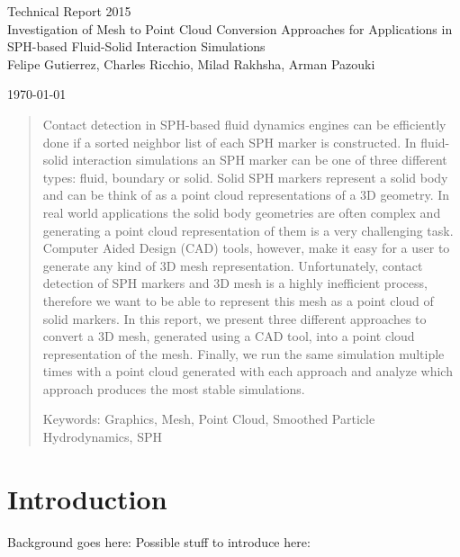 \documentclass[12pt]{article}
\begin{document}
\begin{titlepage}

\begin{center}
\LARGE Technical Report 2015 \\
\vspace{1.0in} 
\Large Investigation of Mesh to Point Cloud Conversion Approaches for Applications in SPH-based Fluid-Solid Interaction Simulations\\
\vspace{2.0in}
\mdseries Felipe Gutierrez, Charles Ricchio, Milad Rakhsha, Arman Pazouki \\

\vfill

\today

\end{center}

\end{titlepage}
\newpage 

\begin{abstract}
Contact detection in SPH-based fluid dynamics engines can be efficiently done if a sorted neighbor list of each SPH marker is constructed. In fluid-solid interaction simulations an SPH marker can be one of three different types: fluid, boundary or solid. Solid SPH markers represent a solid body and can be think of as a point cloud representations of a 3D geometry. In real world applications the solid body geometries are often complex and generating a point cloud representation of them is a very challenging task. Computer Aided Design (CAD) tools, however, make it easy for a user to generate any kind of 3D mesh representation. Unfortunately, contact detection of SPH markers and 3D mesh is a highly inefficient process, therefore we want to be able to represent this mesh as a point cloud of solid markers. In this report, we present three different approaches to convert a 3D mesh, generated using a CAD tool, into a point cloud representation of the mesh. Finally, we run the same simulation multiple times with a point cloud generated with each approach and analyze which approach produces the most stable simulations.

Keywords: Graphics, Mesh, Point Cloud, Smoothed Particle Hydrodynamics, SPH
\end{abstract}
\newpage 

\tableofcontents
\newpage

\section{Introduction}
\label{sec:introduction}
Background goes here:
Possible stuff to introduce here: 
\end{document}
